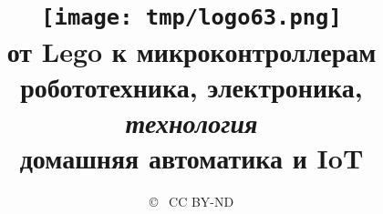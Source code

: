 

\title{\texttt{[image: tmp/logo63.png]}\\
{\Huge от Lego к микроконтроллерам}\\
робототехника, электроника, \textit{технология}\\домашняя автоматика и IoT}

\author{ 
\copyright\  CC BY-ND
}

\newcommand{\licence}{
	\textcolor{blue}{\textbf{\copyright\ Creative Commons BY-ND, 2019}}
}





\maketitle

\def\contentsname{\empty}
\tableofcontents\secdown





























